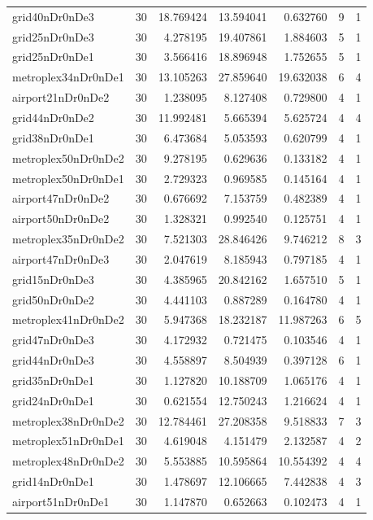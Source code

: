\documentclass[../../../thesis.tex]{subfiles}
\begin{document}
\begin{longtable}{|l|r|r|r|r|r|r|}
grid40nDr0nDe3 & 30 & 18.769424 & 13.594041 & 0.632760 & 9 & 1 \\
grid25nDr0nDe3 & 30 & 4.278195 & 19.407861 & 1.884603 & 5 & 1 \\
grid25nDr0nDe1 & 30 & 3.566416 & 18.896948 & 1.752655 & 5 & 1 \\
metroplex34nDr0nDe1 & 30 & 13.105263 & 27.859640 & 19.632038 & 6 & 4 \\
airport21nDr0nDe2 & 30 & 1.238095 & 8.127408 & 0.729800 & 4 & 1 \\
grid44nDr0nDe2 & 30 & 11.992481 & 5.665394 & 5.625724 & 4 & 4 \\
grid38nDr0nDe1 & 30 & 6.473684 & 5.053593 & 0.620799 & 4 & 1 \\
metroplex50nDr0nDe2 & 30 & 9.278195 & 0.629636 & 0.133182 & 4 & 1 \\
metroplex50nDr0nDe1 & 30 & 2.729323 & 0.969585 & 0.145164 & 4 & 1 \\
airport47nDr0nDe2 & 30 & 0.676692 & 7.153759 & 0.482389 & 4 & 1 \\
airport50nDr0nDe2 & 30 & 1.328321 & 0.992540 & 0.125751 & 4 & 1 \\
metroplex35nDr0nDe2 & 30 & 7.521303 & 28.846426 & 9.746212 & 8 & 3 \\
airport47nDr0nDe3 & 30 & 2.047619 & 8.185943 & 0.797185 & 4 & 1 \\
grid15nDr0nDe3 & 30 & 4.385965 & 20.842162 & 1.657510 & 5 & 1 \\
grid50nDr0nDe2 & 30 & 4.441103 & 0.887289 & 0.164780 & 4 & 1 \\
metroplex41nDr0nDe2 & 30 & 5.947368 & 18.232187 & 11.987263 & 6 & 5 \\
grid47nDr0nDe3 & 30 & 4.172932 & 0.721475 & 0.103546 & 4 & 1 \\
grid44nDr0nDe3 & 30 & 4.558897 & 8.504939 & 0.397128 & 6 & 1 \\
grid35nDr0nDe1 & 30 & 1.127820 & 10.188709 & 1.065176 & 4 & 1 \\
grid24nDr0nDe1 & 30 & 0.621554 & 12.750243 & 1.216624 & 4 & 1 \\
metroplex38nDr0nDe2 & 30 & 12.784461 & 27.208358 & 9.518833 & 7 & 3 \\
metroplex51nDr0nDe1 & 30 & 4.619048 & 4.151479 & 2.132587 & 4 & 2 \\
metroplex48nDr0nDe2 & 30 & 5.553885 & 10.595864 & 10.554392 & 4 & 4 \\
grid14nDr0nDe1 & 30 & 1.478697 & 12.106665 & 7.442838 & 4 & 3 \\
airport51nDr0nDe1 & 30 & 1.147870 & 0.652663 & 0.102473 & 4 & 1 \\

\end{longtable}
\end{document}
